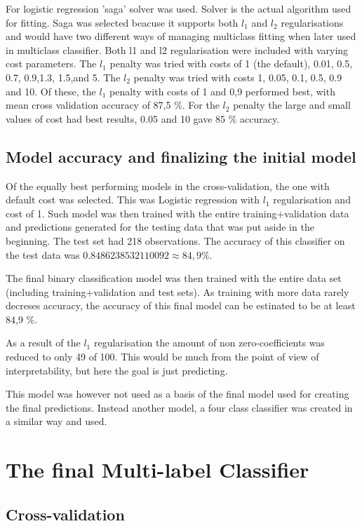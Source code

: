 \documentclass[a4size, 12pt]{report}
\begin{document}
		For logistic regression 'saga' solver was used. Solver is the actual algorithm used for fitting. Saga was selected beacuse it supports both $l_1$ and $l_2$ regularisations and would have two different ways of managing multiclass fitting when later used in multiclass classifier.  Both l1 and l2 regularisation were included with varying cost parameters. The $l_1$ penalty was tried with costs of 1 (the default), 0.01, 0.5,  0.7, 0.9,1.3,  1.5,and 5. The $l_2$ penalty was tried with costs 1, 0.05,  0.1, 0.5, 0.9 and 10. 
		Of these, the $l_1$ penalty with costs of 1 and 0,9 performed best, with mean cross validation accuracy of 87,5 \%. For the $l_2$ penalty the large and small values of cost had best results, 0.05 and 10 gave 85 \% accuracy.		
  
	
\subsection*{Model accuracy and finalizing the initial model}
	
	Of the equally best performing models in the cross-validation, the one with default cost was selected. This was Logistic regression with $l_1$ regularisation and cost of 1. Such model was then trained with the entire training+validation data and predictions generated for the testing data that was put aside in the beginning. The test set had 218 observations. The accuracy of this classifier on the test data was $0.8486238532110092 \approx 84,9 \%$. 
	
	The final binary classification model was then trained with the entire data set (including training+validation and test sets). As training with more data rarely decreses accuracy, the accuracy of this final model can be estinated to be at least 84,9 \%.  
	
	As a result of the $l_1$ regularisation the amount of non zero-coefficients was reduced to only 49 of 100. This would be much from the point of view of interpretability, but here the goal is just predicting. 
	
		This model was however not used as a basis of the final model used for creating the final predictions. Instead another model, a four class classifier was created in a similar way and used.
	
	\section*{The final Multi-label Classifier}
	
	
	\subsection*{Cross-validation}
	
\end{document}
